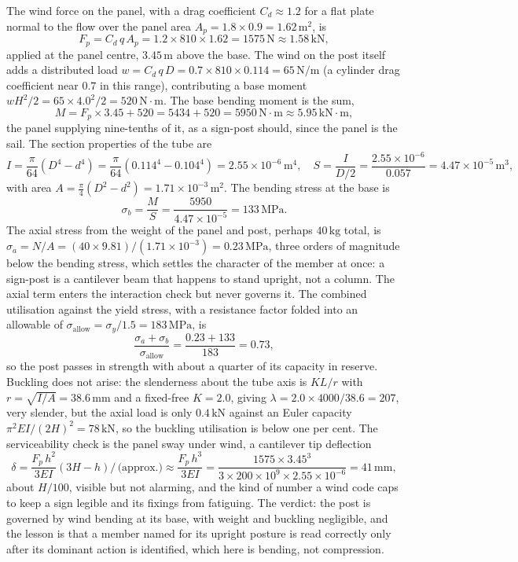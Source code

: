 The wind force on the panel, with a drag coefficient $C_d \approx 1.2$ for
a flat plate normal to the flow over the panel area $A_p = 1.8 \times 0.9
= 1.62\,\si{\meter\squared}$, is
\[
F_p = C_d\,q\,A_p = 1.2 \times 810 \times 1.62 = 1575\,\text{N}
\approx 1.58\,\text{kN},
\]
applied at the panel centre, $3.45\,\si{\meter}$ above the base. The wind
on the post itself adds a distributed load $w = C_d\,q\,D = 0.7 \times 810
\times 0.114 = 65\,\text{N}/\text{m}$ (a cylinder drag coefficient near
$0.7$ in this range), contributing a base moment $wH^2/2 = 65 \times
4.0^2/2 = 520\,\text{N}\cdot\text{m}$. The base bending moment is the sum,
\[
M = F_p \times 3.45 + 520 = 5434 + 520 = 5950\,\text{N}\cdot\text{m}
\approx 5.95\,\text{kN}\cdot\text{m},
\]
the panel supplying nine-tenths of it, as a sign-post should, since the
panel is the sail. The section properties of the tube are
\[
I = \frac{\pi}{64}(D^4 - d^4)
= \frac{\pi}{64}(0.114^4 - 0.104^4) = 2.55 \times 10^{-6}\,\si{\meter
\tothe{4}}, \quad
S = \frac{I}{D/2} = \frac{2.55 \times 10^{-6}}{0.057}
= 4.47 \times 10^{-5}\,\si{\meter\cubed},
\]
with area $A = \tfrac{\pi}{4}(D^2-d^2) = 1.71 \times 10^{-3}\,\si{\meter
\squared}$. The bending stress at the base is
\[
\sigma_b = \frac{M}{S} = \frac{5950}{4.47 \times 10^{-5}}
= 133\,\text{MPa}.
\]
The axial stress from the weight of the panel and post, perhaps $40\,
\text{kg}$ total, is $\sigma_a = N/A = (40 \times 9.81)/(1.71 \times
10^{-3}) = 0.23\,\text{MPa}$, three orders of magnitude below the bending
stress, which settles the character of the member at once: a sign-post is
a cantilever beam that happens to stand upright, not a column. The axial
term enters the interaction check but never governs it. The combined
utilisation against the yield stress, with a resistance factor folded into
an allowable of $\sigma_{\text{allow}} = \sigma_y/1.5 = 183\,\text{MPa}$,
is
\[
\frac{\sigma_a + \sigma_b}{\sigma_{\text{allow}}}
= \frac{0.23 + 133}{183} = 0.73,
\]
so the post passes in strength with about a quarter of its capacity in
reserve. Buckling does not arise: the slenderness about the tube axis is
$KL/r$ with $r=\sqrt{I/A}=38.6\,\si{\milli\meter}$ and a fixed-free
$K=2.0$, giving $\lambda = 2.0 \times 4000/38.6 = 207$, very slender, but
the axial load is only $0.4\,\text{kN}$ against an Euler capacity
$\pi^2 EI/(2H)^2 = 78\,\text{kN}$, so the buckling utilisation is below
one per cent. The serviceability check is the panel sway under wind, a
cantilever tip deflection
\[
\delta = \frac{F_p\,h^2}{3EI}(3H - h)\big/\,\text{(approx.)}
\approx \frac{F_p\,h^3}{3EI}
= \frac{1575 \times 3.45^3}{3 \times 200 \times 10^9 \times 2.55 \times
10^{-6}} = 41\,\si{\milli\meter},
\]
about $H/100$, visible but not alarming, and the kind of number a wind
code caps to keep a sign legible and its fixings from fatiguing. The
verdict: the post is governed by wind bending at its base, with weight and
buckling negligible, and the lesson is that a member named for its
upright posture is read correctly only after its dominant action is
identified, which here is bending, not compression.


